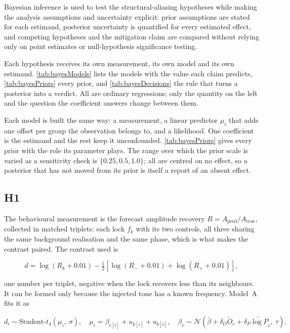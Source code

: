 Bayesian inference is used to test the structural-aliasing hypotheses while making the analysis assumptions and uncertainty explicit: prior assumptions are stated for each estimand, posterior uncertainty is quantified for every estimated effect, and competing hypotheses and the mitigation claim are compared without relying only on point estimates or null-hypothesis significance testing.

Each hypothesis receives its own measurement, its own model and its own estimand. \autoref{tab:bayesModels} lists the models with the value each claim predicts, \autoref{tab:bayesPriors} every prior, and \autoref{tab:bayesDecisions} the rule that turns a posterior into a verdict. All are ordinary regressions; only the quantity on the left and the question the coefficient answers change between them.


\FloatBarrier

Each model is built the same way: a measurement, a linear predictor $\mu_i$ that adds one offset per group the observation belongs to, and a likelihood. One coefficient is the estimand and the rest keep it unconfounded. \autoref{tab:bayesPriors} gives every prior with the role its parameter plays. The range over which the prior scale is varied as a sensitivity check is $\{0.25,0.5,1.0\}$; all are centred on no effect, so a posterior that has not moved from its prior is itself a report of an absent effect.

\subsection{H1}
The behavioural measurement is the forecast amplitude recovery $R=A_{\text{pred}}/A_{\text{true}}$, collected in matched triplets: each lock $f_k$ with its two controls, all three sharing the same background realisation and the same phase, which is what makes the contrast paired. The contrast used is

\begin{equation}
\label{eq:d2contrast}
d = \log(R_k + 0.01) - \tfrac{1}{2}\left[\log(R_- + 0.01) + \log(R_+ + 0.01)\right],
\end{equation}

one number per triplet, negative when the lock recovers less than its neighbours. It can be formed only because the injected tone has a known frequency. Model~A fits it as

\begin{equation}
\label{eq:d2hier}
d_i \sim \text{Student-}t_4(\mu_i,\ \sigma),
\quad
\mu_i = \beta_{c[i]} + u_{k[i]} + u_{b[i]},
\quad
\beta_c \sim \mathcal{N}\!\left(\bar\beta + \delta_O \widetilde O_c + \delta_P \widetilde{\log P}_c,\ \tau\right).
\end{equation}

